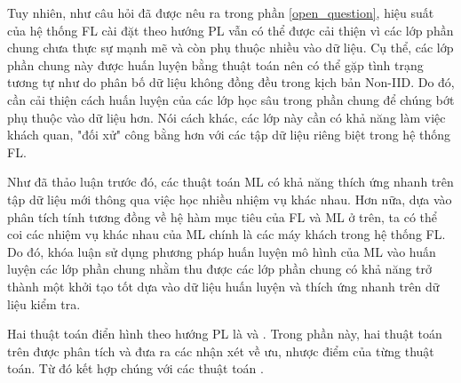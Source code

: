 Tuy nhiên, như câu hỏi đã được nêu ra trong phần \ref{open_question}, hiệu suất của hệ thống FL cài đặt theo hướng PL vẫn có thể được cải thiện vì các lớp phần chung chưa thực sự mạnh mẽ và còn phụ thuộc nhiều vào dữ liệu. Cụ thể, các lớp phần chung này được huấn luyện bằng thuật toán  nên có thể gặp tình trạng tương tự như  do phân bố dữ liệu không đồng đều trong kịch bản Non-IID. Do đó, cần cải thiện cách huấn luyện của các lớp học sâu trong phần chung để chúng bớt phụ thuộc vào dữ liệu hơn. Nói cách khác, các lớp này cần có khả năng làm việc khách quan, "đối xử" công bằng hơn với các tập dữ liệu riêng biệt trong hệ thống FL.

Như đã thảo luận trước đó, các thuật toán ML có khả năng thích ứng nhanh trên tập dữ liệu mới thông qua việc học nhiều nhiệm vụ khác nhau. Hơn nữa, dựa vào phân tích tính tương đồng về hệ hàm mục tiêu của FL và ML ở trên, ta có thể coi các nhiệm vụ khác nhau của ML chính là các máy khách trong hệ thống FL. Do đó, khóa luận sử dụng phương pháp huấn luyện mô hình của ML vào huấn luyện các lớp phần chung nhằm thu được các lớp phần chung có khả năng trở thành một khởi tạo tốt dựa vào dữ liệu huấn luyện và thích ứng nhanh trên dữ liệu kiểm tra.

Hai thuật toán điển hình theo hướng PL là  \cite{arivazhagan2019federated} và  \cite{liang2020think}. Trong phần này, hai thuật toán trên được phân tích và đưa ra các nhận xét về ưu, nhược điểm của từng thuật toán. Từ đó kết hợp chúng với các thuật toán .
